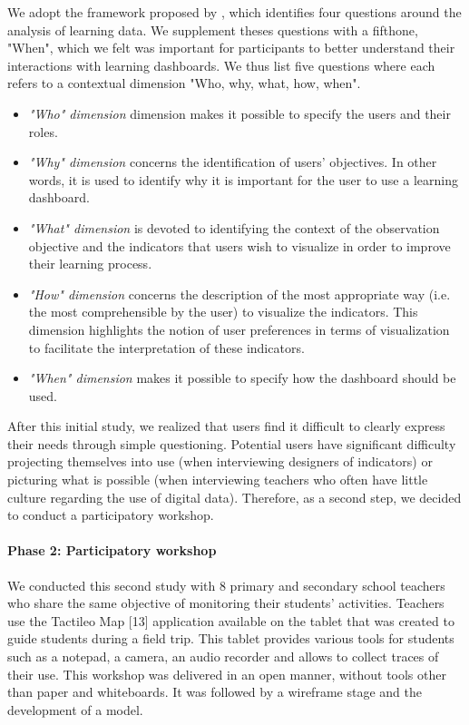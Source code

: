 \documentclass[preprint,12pt]{elsarticle}
\begin{document}
We adopt the framework proposed by \citet{chatti2012reference}, which identifies four questions around the analysis of learning data. We supplement theses questions with a fifthone, "When", which we felt was important for participants to better understand their interactions with learning dashboards. We thus list five questions where each refers to a contextual dimension "Who, why, what, how, when".
\begin{itemize}
    \item \textit{"Who" dimension}  dimension makes it possible to specify the users and their roles.
    \item \textit{"Why" dimension} concerns the identification of users' objectives. In other words, it is used to identify why it is important for the user to use a learning dashboard.
    \item \textit{"What" dimension}  is devoted to identifying the context of the observation objective and the indicators that users wish to visualize in order to improve their learning process.
    \item \textit{"How" dimension}  concerns the description of the most appropriate way (i.e. the most comprehensible by the user) to visualize the indicators. This dimension highlights the notion of user preferences in terms of visualization to facilitate the interpretation of these indicators.
    \item \textit{"When" dimension} makes it possible to specify how the dashboard should be used. 
\end{itemize}

After this initial study, we realized that users find it difficult to clearly express their needs through simple questioning. Potential users have significant difficulty projecting themselves into use (when interviewing designers of indicators) or picturing what is possible (when interviewing teachers who often have little culture regarding the use of digital data). Therefore, as a second step, we decided to conduct a participatory workshop.

\paragraph{Phase 2: Participatory workshop}
We conducted this second study with 8 primary and secondary school teachers who share the same objective of monitoring their students' activities. Teachers use the Tactileo Map [13] application available on the tablet that was created to guide students during a field trip. This tablet provides various tools for students such as a notepad, a camera, an audio recorder and allows to collect traces of their use. This workshop was delivered in an open manner, without tools other than paper and whiteboards. It was followed by a wireframe stage and the development of a model.
\end{document}
